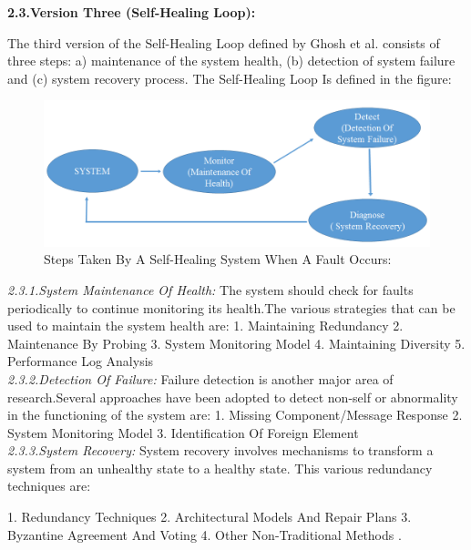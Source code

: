 \textbf{2.3.Version Three (Self-Healing Loop):\\}

The third version of the Self-Healing Loop defined by Ghosh et al. consists of three steps:   a) maintenance of the system health, (b) detection of system failure and (c) system recovery process. The Self-Healing Loop Is defined in the figure:

\begin{figure}[H]
\includegraphics[width=5in]{img/SelfHealingStagesGhoshetal}
\caption{Steps Taken By A Self-Healing System When A Fault Occurs:}
\end{figure}

\textit{2.3.1.System Maintenance Of Health:}
The system should check for faults periodically to
continue monitoring its health.The various strategies that can be used to maintain the system health are:
1. Maintaining Redundancy
2. Maintenance By Probing
3. System Monitoring Model
4. Maintaining Diversity
5. Performance Log Analysis\\

\textit{2.3.2.Detection Of Failure:}
Failure detection is another major area of research.Several approaches have been adopted
to detect non-self or abnormality in the functioning of the system are:
1. Missing Component/Message Response
2. System Monitoring Model
3. Identification Of Foreign Element\\

\textit{2.3.3.System Recovery:}
System recovery involves mechanisms to transform a system from an unhealthy state to a healthy state. 
This various redundancy techniques are:

1. Redundancy Techniques
2. Architectural Models And Repair Plans
3. Byzantine Agreement And Voting
4. Other Non-Traditional Methods
\cite{Ghosh:SelfHealingSurvey:2007}.\\
